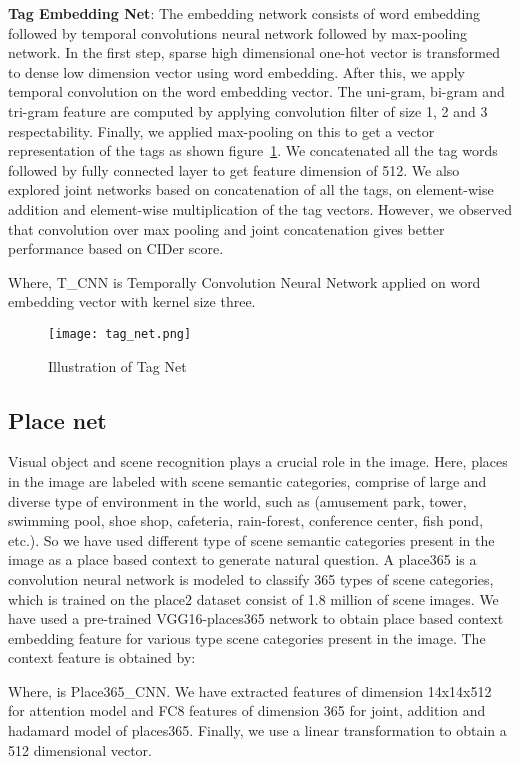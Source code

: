 \documentclass[11pt,a4paper]{article}
\begin{document}
\textbf{Tag Embedding Net}:
The embedding network consists of word embedding followed by temporal convolutions neural network followed by max-pooling network. In the first step, sparse high dimensional one-hot vector is transformed to dense low dimension vector using word embedding. After this, we apply temporal convolution on the word embedding vector. The uni-gram, bi-gram and tri-gram feature are computed by applying convolution filter of size 1, 2 and 3 respectability. Finally, we applied max-pooling on this to get a vector representation of the tags as shown figure~\ref{fig:tag}. We concatenated all the tag words followed by fully connected layer to get feature dimension of 512. We also explored joint networks based on concatenation of all the tags, on element-wise addition and element-wise multiplication of the tag vectors. However, we observed that convolution over max pooling and joint concatenation gives better performance based on CIDer score.

Where, T\_CNN is Temporally Convolution Neural Network applied on word embedding vector with kernel size three.

\begin{figure}[ht]
\centering
\texttt{[image: tag\_net.png]}
	\caption{ Illustration of Tag Net }
	\label{fig:tag}
\end{figure}


\subsection{Place net}
Visual object and scene recognition plays a crucial role in the image. Here, places in the image are  labeled with scene semantic categories\cite{Zhou_PAMI2017}, comprise of large and diverse type of environment in the world, such as (amusement park, tower, swimming pool, shoe shop, cafeteria, rain-forest, conference center, fish pond, etc.). So we have used different type of scene semantic categories present in the image as a place based context to generate natural question. A place365 is a convolution neural network is modeled to classify 365 types of scene categories, which is trained on the place2 dataset consist of 1.8 million of scene images. We have used a pre-trained VGG16-places365 network to obtain place based context embedding feature for  various type scene categories present in the image. The context feature  is obtained by:
 
Where,  is Place365\_CNN. We have extracted  features of dimension 14x14x512 for attention model and FC8 features of dimension 365 for joint, addition and hadamard model of places365. Finally, we use a linear transformation to obtain a 512 dimensional vector.
 
\end{document}
